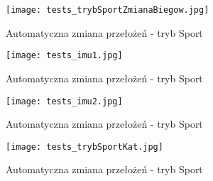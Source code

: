 \begin{figure}[h]
    \centering
    \texttt{[image: tests\_trybSportZmianaBiegow.jpg]}
    \caption{Automatyczna zmiana przełożeń - tryb Sport}
    \label{fig:tests_sportMode}
\end{figure}

\begin{figure}[h]
    \centering
    \texttt{[image: tests\_imu1.jpg]}
    \caption{Automatyczna zmiana przełożeń - tryb Sport}
    \label{fig:tests_sportMode}
\end{figure}

\begin{figure}[h]
    \centering
    \texttt{[image: tests\_imu2.jpg]}
    \caption{Automatyczna zmiana przełożeń - tryb Sport}
    \label{fig:tests_sportMode}
\end{figure}
\begin{figure}[h]
    \centering
    \texttt{[image: tests\_trybSportKat.jpg]}
    \caption{Automatyczna zmiana przełożeń - tryb Sport}
    \label{fig:tests_sportMode}
\end{figure}

